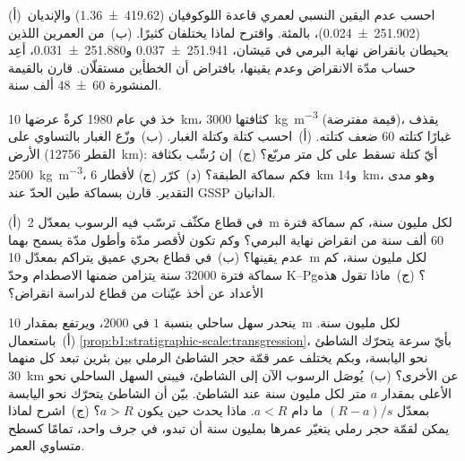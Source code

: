 \begin{exercise}[$\star\star$]\label{exo:b1:stratigraphic-scale:7}
(أ)~احسب عدم اليقين النسبي لعمري قاعدة اللوكوفيان (\qty[uncertainty-mode=separate]{419.62(136)}{\Ma}) والإنديان (\qty[uncertainty-mode=separate]{251.902(24)}{\Ma})، بالمئة. واقترح لماذا يختلفان كثيرًا. (ب)~من العمرين اللذين يحيطان بانقراض نهاية البرمي في مَيشان، \qty[uncertainty-mode=separate]{251.941(37)}{\Ma} و\qty[uncertainty-mode=separate]{251.880(31)}{\Ma}، أعِد حساب مدّة الانقراض وعدم يقينها، بافتراض أن الخطأين مستقلّان. قارن بالقيمة المنشورة \num[uncertainty-mode=separate]{60 \pm 48} ألف سنة.
\end{exercise}

\begin{exercise}[$\star\star$]\label{exo:b1:stratigraphic-scale:8}
خذ  في عام 1980 كرةً عرضها \qty{10}{km}، كثافتها \qty{3000}{kg.m^{-3}} (قيمة مفترضة)، يقذف غبارًا كتلته 60 ضعف كتلته. (أ)~احسب كتلة  وكتلة الغبار. (ب)~وزّع الغبار بالتساوي على الأرض (القطر \qty{12756}{km}): أيّ كتلة تسقط على كل متر مربّع؟ (ج)~إن رُسِّب بكثافة \qty{2500}{kg.m^{-3}}، فكم سماكة الطبقة؟ (د)~كرّر (ج) لأقطار \qty{6}{km} و\qty{14}{km}، وهو مدى التقدير. قارن بسماكة طين الحدّ عند GSSP الدانيان.
\end{exercise}

\begin{exercise}[$\star\star$]\label{exo:b1:stratigraphic-scale:9}
(أ)~في قطاع مكثّف ترسّب فيه الرسوب بمعدّل \qty{2}{m} لكل مليون سنة، كم سماكة فترة \num{60} ألف سنة من انقراض نهاية البرمي؟ وكم تكون لأقصر مدّة وأطول مدّة يسمح بهما عدم يقينها؟ (ب)~في قطاع بحري عميق يتراكم بمعدّل \qty{10}{m} لكل مليون سنة، كم سماكة فترة \num{32000} سنة يتزامن ضمنها الاصطدام وحدّ K--Pg؟ (ج)~ماذا تقول هذه الأعداد عن أخذ عيّنات من قطاع لدراسة انقراض؟
\end{exercise}

\begin{exercise}[$\star\star\star$]\label{exo:b1:stratigraphic-scale:10}
ينحدر سهل ساحلي بنسبة $1$ في $2000$، ويرتفع  بمقدار \qty{10}{m} لكل مليون سنة. (أ)~باستعمال \cref{prop:b1:stratigraphic-scale:transgression}، بأيّ سرعة يتحرّك الشاطئ نحو اليابسة، وبكم يختلف عمر قمّة حجر الشاطئ الرملي بين بئرين تبعد كل منهما \qty{30}{km} عن الأخرى؟ (ب)~يُوصَل الرسوب الآن إلى الشاطئ، فيبني السهل الساحلي نحو الأعلى بمقدار $a$ متر لكل مليون سنة عند الشاطئ. بيّن أن الشاطئ يتحرّك نحو اليابسة بمعدّل $(R - a)/s$ ما دام $a < R$. ماذا يحدث حين يكون $a > R$؟ (ج)~اشرح لماذا يمكن لقمّة حجر رملي يتغيّر عمرها بمليون سنة أن تبدو، في جرف واحد، تمامًا كسطح متساوي العمر.
\end{exercise}

